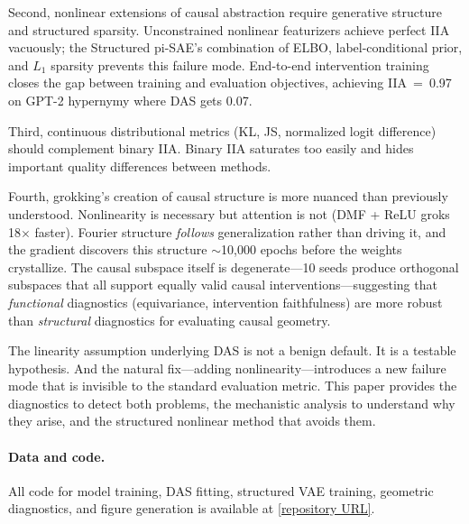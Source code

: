 \documentclass{article}
\begin{document}
Second, nonlinear extensions of causal abstraction require generative structure
and structured sparsity. Unconstrained nonlinear featurizers achieve perfect IIA
vacuously; the Structured pi-SAE's combination of ELBO, label-conditional prior,
and $L_1$ sparsity prevents this failure mode. End-to-end intervention training
closes the gap between training and evaluation objectives, achieving IIA~=~0.97
on GPT-2 hypernymy where DAS gets 0.07.

Third, continuous distributional metrics (KL, JS, normalized logit difference)
should complement binary IIA. Binary IIA saturates too easily and hides
important quality differences between methods.

Fourth, grokking's creation of causal structure is more nuanced than previously
understood. Nonlinearity is necessary but attention is not (DMF + ReLU groks
18$\times$ faster). Fourier structure \emph{follows} generalization rather than
driving it, and the gradient discovers this structure $\sim$10{,}000 epochs
before the weights crystallize. The causal subspace itself is degenerate---10
seeds produce orthogonal subspaces that all support equally valid causal
interventions---suggesting that \emph{functional} diagnostics (equivariance,
intervention faithfulness) are more robust than \emph{structural} diagnostics
for evaluating causal geometry.

The linearity assumption underlying DAS is not a benign default. It is a testable
hypothesis. And the natural fix---adding nonlinearity---introduces a new failure
mode that is invisible to the standard evaluation metric. This paper provides
the diagnostics to detect both problems, the mechanistic analysis to understand
why they arise, and the structured nonlinear method that avoids them.

\paragraph{Data and code.} All code for model training, DAS fitting, structured
VAE training, geometric diagnostics, and figure generation is available at
\url{[repository URL]}.

%
%



\end{document}
